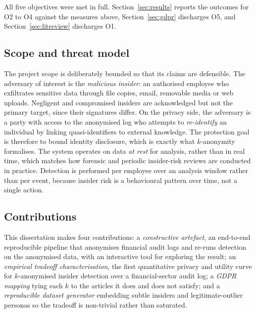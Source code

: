 \documentclass[10pt,a4paper]{article}
\begin{document}
\noindent All five objectives were met in full. Section~\ref{sec:results} reports the outcomes for O2 to O4 against the measures above, Section~\ref{sec:gdpr} discharges O5, and Section~\ref{sec:litreview} discharges O1.

\subsection{Scope and threat model}
The project scope is deliberately bounded so that its claims are defensible. The adversary of interest is the \emph{malicious insider}: an authorised employee who exfiltrates sensitive data through file copies, email, removable media or web uploads. Negligent and compromised insiders are acknowledged but not the primary target, since their signatures differ. On the privacy side, the adversary is a party with access to the anonymised log who attempts to \emph{re-identify} an individual by linking quasi-identifiers to external knowledge. The protection goal is therefore to bound identity disclosure, which is exactly what $k$-anonymity formalises. The system operates on data \emph{at rest} for analysis, rather than in real time, which matches how forensic and periodic insider-risk reviews are conducted in practice. Detection is performed per employee over an analysis window rather than per event, because insider risk is a behavioural pattern over time, not a single action.

\subsection{Contributions}
This dissertation makes four contributions: a \emph{constructive artefact}, an end-to-end reproducible pipeline that anonymises financial audit logs and re-runs detection on the anonymised data, with an interactive tool for exploring the result; an \emph{empirical tradeoff characterisation}, the first quantitative privacy and utility curve for $k$-anonymised insider detection over a financial-sector audit log; a \emph{GDPR mapping} tying each $k$ to the articles it does and does not satisfy; and a \emph{reproducible dataset generator} embedding subtle insiders and legitimate-outlier personas so the tradeoff is non-trivial rather than saturated.
\end{document}
